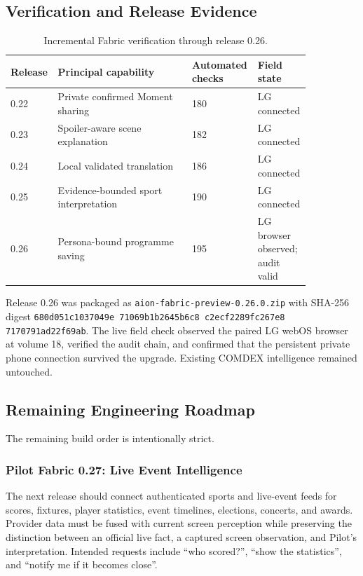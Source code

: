 \subsection{Verification and Release Evidence}

\begin{table}[htbp]
\centering
\small
\begin{tabular}{p{0.11\linewidth} p{0.44\linewidth} p{0.14\linewidth} p{0.16\linewidth}}
\toprule
Release & Principal capability & Automated checks & Field state \\
\midrule
0.22 & Private confirmed Moment sharing & 180 & LG connected \\
0.23 & Spoiler-aware scene explanation & 182 & LG connected \\
0.24 & Local validated translation & 186 & LG connected \\
0.25 & Evidence-bounded sport interpretation & 190 & LG connected \\
0.26 & Persona-bound programme saving & 195 & LG browser observed; audit valid \\
\bottomrule
\end{tabular}
\caption{Incremental Fabric verification through release 0.26.}
\label{tab:pilot-fabric-release-evidence}
\end{table}

Release 0.26 was packaged as
\texttt{aion-fabric-preview-0.26.0.zip} with SHA-256 digest
\texttt{680d051c1037049e\allowbreak
71069b1b2645b6c8\allowbreak
c2ecf2289fc267e8\allowbreak
7170791ad22f69ab}.
The live field check observed the paired LG webOS browser at volume 18, verified
the audit chain, and confirmed that the persistent private phone connection
survived the upgrade.  Existing COMDEX intelligence remained untouched.

\subsection{Remaining Engineering Roadmap}

The remaining build order is intentionally strict.

\subsubsection{Pilot Fabric 0.27: Live Event Intelligence}

The next release should connect authenticated sports and live-event feeds for
scores, fixtures, player statistics, event timelines, elections, concerts, and
awards.  Provider data must be fused with current screen perception while
preserving the distinction between an official live fact, a captured screen
observation, and Pilot's interpretation.  Intended requests include ``who
scored?'', ``show the statistics'', and ``notify me if it becomes close''.

